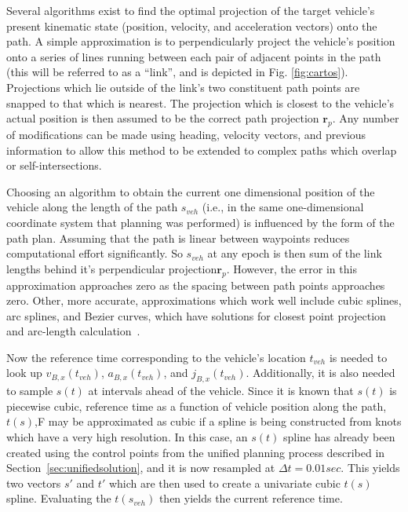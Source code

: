 \documentclass[letterpaper, 10 pt, conference]{ieeeconf}  %
\begin{document}

Several algorithms exist to find the optimal projection of the target vehicle's present kinematic state (position, velocity, and acceleration vectors) onto the path.
A simple approximation is to perpendicularly project the vehicle's position onto a series of lines running between each pair of adjacent points in the path (this will be referred to as a ``link'', and is depicted in Fig. \ref{fig:cartos}).
Projections which lie outside of the link's two constituent path points are snapped to that which is nearest.
The projection which is closest to the vehicle's actual position is then assumed to be the correct path projection $\mathbf{r}_p$.
Any number of modifications can be made using heading, velocity vectors, and previous information to allow this method to be extended to complex paths which overlap or self-intersections.

Choosing an algorithm to obtain the current one dimensional position of the vehicle along the length of the path $s_{veh}$ (i.e., in the same one-dimensional coordinate system that planning was performed) is influenced by the form of the path plan.
Assuming that the path is linear between waypoints reduces computational effort significantly.
So $s_{veh}$ at any epoch is then sum of the link lengths behind it's perpendicular projection$\mathbf{r}_p$.
However, the error in this approximation approaches zero as the spacing between path points approaches zero.
Other, more accurate, approximations which work well include cubic splines, arc splines, and Bezier curves, which have solutions for closest point projection and arc-length calculation~\cite{Wang2002,Wang2003,Schindler2011}.

Now the reference time corresponding to the vehicle's location $t_{veh}$ is needed to look up $v_{B,x}(t_{veh})$, $a_{B,x}(t_{veh})$, and $j_{B,x}(t_{veh})$.
Additionally, it is also needed to sample $s(t)$ at intervals ahead of the vehicle.
Since it is known that $s(t)$ is piecewise cubic, reference time as a function of vehicle position along the path, $t(s)$,F may be approximated as cubic if a spline is being constructed from knots which have a very high resolution.
In this case, an $s(t)$ spline has already been created using the control points from the unified planning process described in Section~\ref{sec:unifiedsolution}, and it is now resampled at $\Delta t = 0.01 sec$.
This yields two vectors $s'$ and $t'$ which are then used to create a univariate cubic $t(s)$ spline.
Evaluating the $t(s_{veh})$ then yields the current reference time.
\end{document}
